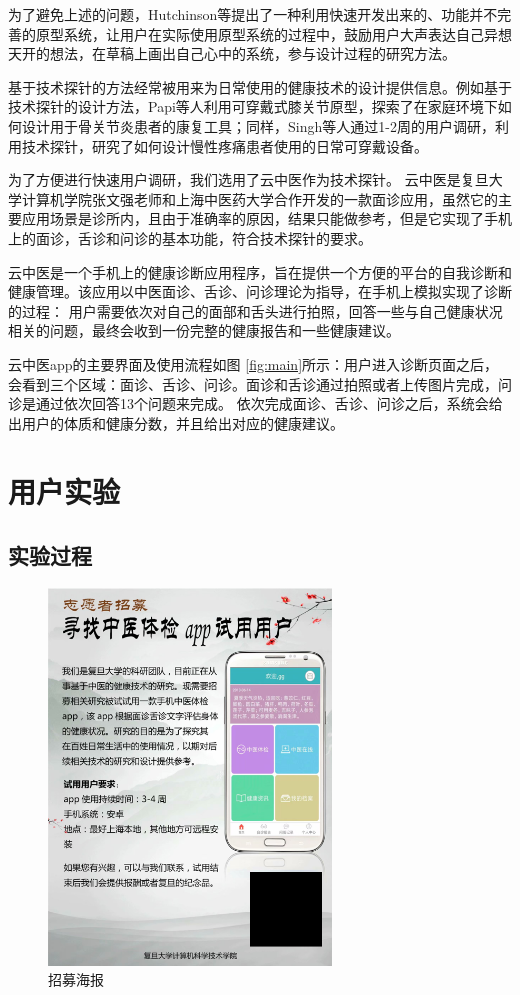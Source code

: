为了避免上述的问题，Hutchinson等\cite{Hutchinson2003Technology}提出了一种利用快速开发出来的、功能并不完善的原型系统，让用户在实际使用原型系统的过程中，鼓励用户大声表达自己异想天开的想法，在草稿上画出自己心中的系统，参与设计过程的研究方法。

基于技术探针的方法经常被用来为日常使用的健康技术的设计提供信息。例如基于技术探针的设计方法，Papi等人\cite{papi2015knee}利用可穿戴式膝关节原型，探索了在家庭环境下如何设计用于骨关节炎患者的康复工具；同样，Singh等人\cite{singh2017supporting}通过1-2周的用户调研，利用技术探针，研究了如何设计慢性疼痛患者使用的日常可穿戴设备。


为了方便进行快速用户调研，我们选用了云中医\cite{Zhang2018Study}作为技术探针。
云中医是复旦大学计算机学院张文强老师和上海中医药大学合作开发的一款面诊应用，虽然它的主要应用场景是诊所内，且由于准确率的原因，结果只能做参考，但是它实现了手机上的面诊，舌诊和问诊的基本功能，符合技术探针的要求。

云中医是一个手机上的健康诊断应用程序，旨在提供一个方便的平台的自我诊断和健康管理。该应用以中医面诊、舌诊、问诊理论为指导，在手机上模拟实现了诊断的过程：
用户需要依次对自己的面部和舌头进行拍照，回答一些与自己健康状况相关的问题，最终会收到一份完整的健康报告和一些健康建议。

云中医app的主要界面及使用流程如图 \ref{fig:main}所示：用户进入诊断页面之后，会看到三个区域：面诊、舌诊、问诊。面诊和舌诊通过拍照或者上传图片完成，问诊是通过依次回答13个问题来完成。
依次完成面诊、舌诊、问诊之后，系统会给出用户的体质和健康分数，并且给出对应的健康建议。

\section{用户实验}
 


\subsection{实验过程}
\begin{figure}[h]
    \centering
    \includegraphics[height=10cm]{images/poster.png}
    \caption{招募海报}
    \label{fig:poster}
\end{figure}

